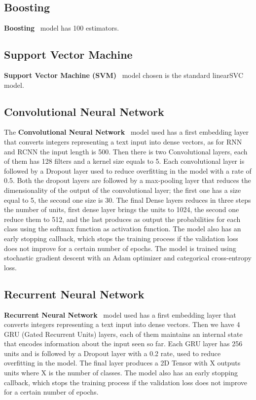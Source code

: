 \subsection{Boosting}
\textbf{Boosting}~\cite{paper-text-classification-algorithms} model has 100 estimators.

\subsection{Support Vector Machine}
\textbf{Support Vector Machine (SVM)}~\cite{paper-text-classification-algorithms} model chosen is the standard linearSVC model. 

\subsection{Convolutional Neural Network}
The \textbf{Convolutional Neural Network}~\cite{paper-text-classification-algorithms}  model used has a first embedding layer that converts integers representing a text input into dense vectors, as for RNN and RCNN the input length is 500. Then there is two Convolutional layers, each of them has 128 filters and a kernel size equals to 5. Each convolutional layer is followed by a Dropout layer used to reduce overfitting in the model with a rate of 0.5. Both the dropout layers are followed by a max-pooling layer that reduces the dimensionality of the output of the convolutional layer; the first one has a size equal to 5, the second one size is 30. The final Dense layers reduces in three steps the number of units, first dense layer brings the units to 1024, the second one reduce them to 512, and the last  produces as output the probabilities for each class using the softmax function as activation function. The model also has an early stopping callback, which stops the training process if the validation loss does not improve for a certain number of epochs.
The model is trained using stochastic gradient descent with an Adam optimizer and categorical cross-entropy loss.

\subsection{Recurrent Neural Network}
\textbf{Recurrent Neural Network}~\cite{paper-text-classification-algorithms} model used has a first embedding layer that converts integers representing a text input into dense vectors. Then we have 4 GRU (Gated Recurrent Units) layers, each of them maintains an internal state that encodes information about the input seen so far. Each GRU layer has 256 units and is followed by a Dropout layer with a 0.2 rate, used to reduce overfitting in the model. The final layer produces a 2D Tensor with X outputs units where X is the number of classes. The model also has an early stopping callback, which stops the training process if the validation loss does not improve for a certain number of epochs.

